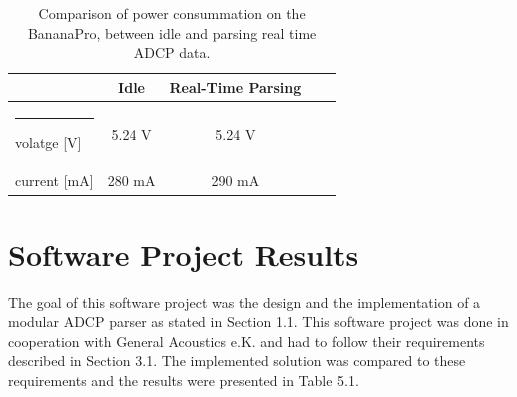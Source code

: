 \begin{table}[h]
	\centering
	\begin{tabular}{l@{\quad}c@{\quad}c@{\quad}c@{\quad}c} \hline \rule{0pt}{8pt}
	  & Idle & Real-Time Parsing \rule{0pt}{8pt} \\\hline \rule{-2pt}{8pt}
	  volatge [V] & 5.24 V & 5.24 V\\
	  current [mA] & 280 mA& 290 mA\\ 
	  \hline
	\end{tabular}
	\caption{Comparison of power consummation on the BananaPro, between idle and parsing real time ADCP data.}
	\label{tab:energy}
\end{table}

\section{Software Project Results}
The goal of this software project was the design and the implementation of a modular ADCP parser as stated in Section 1.1. This software project was done in cooperation with General Acoustics e.K. and had to follow their requirements described in Section 3.1. The implemented solution was compared to these requirements and the results were presented in Table 5.1.

